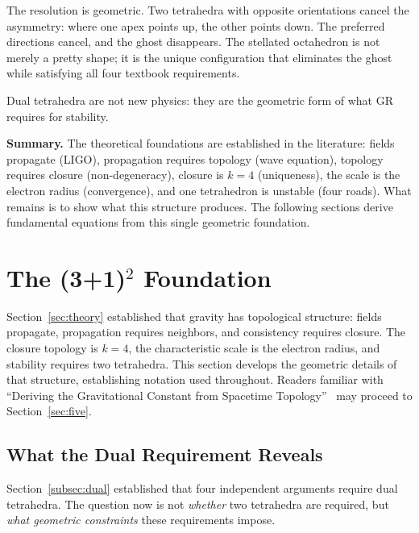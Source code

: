 \documentclass[aps,prd,preprint,superscriptaddress,showpacs,preprintnumbers,amsmath,amssymb,nofootinbib]{revtex4-2}
\begin{document}
The resolution is geometric. Two tetrahedra with opposite orientations cancel the asymmetry: where one apex points up, the other points down. The preferred directions cancel, and the ghost disappears. The stellated octahedron is not merely a pretty shape; it is the unique configuration that eliminates the ghost while satisfying all four textbook requirements.

Dual tetrahedra are not new physics: they are the geometric form of what GR requires for stability.

\vspace{1em}
\noindent\textbf{Summary.} The theoretical foundations are established in the literature: fields propagate (LIGO), propagation requires topology (wave equation), topology requires closure (non-degeneracy), closure is $k = 4$ (uniqueness), the scale is the electron radius (convergence), and one tetrahedron is unstable (four roads). What remains is to show what this structure produces. The following sections derive fundamental equations from this single geometric foundation.

\section{The (3+1)$^2$ Foundation}
\label{sec:foundation}

Section~\ref{sec:theory} established that gravity has topological structure: fields propagate, propagation requires neighbors, and consistency requires closure. The closure topology is $k = 4$, the characteristic scale is the electron radius, and stability requires two tetrahedra. This section develops the geometric details of that structure, establishing notation used throughout. Readers familiar with ``Deriving the Gravitational Constant from Spacetime Topology''~\cite{paper6} may proceed to Section~\ref{sec:five}.

\subsection{What the Dual Requirement Reveals}
\label{subsec:two-tet}

Section~\ref{subsec:dual} established that four independent arguments require dual tetrahedra. The question now is not \emph{whether} two tetrahedra are required, but \emph{what geometric constraints} these requirements impose.
\end{document}
